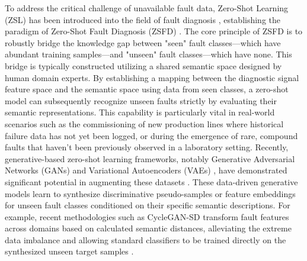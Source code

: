 To address the critical challenge of unavailable fault data, Zero-Shot Learning (ZSL) has been introduced into the field of fault diagnosis \cite{precup2015overview}, establishing the paradigm of Zero-Shot Fault Diagnosis (ZSFD) \cite{lampert2014attribute,xian2019zero,xian2018feature}. The core principle of ZSFD is to robustly bridge the knowledge gap between "seen" fault classes—which have abundant training samples—and "unseen" fault classes—which have none. This bridge is typically constructed utilizing a shared semantic space designed by human domain experts. By establishing a mapping between the diagnostic signal feature space and the semantic space using data from seen classes, a zero-shot model can subsequently recognize unseen faults strictly by evaluating their semantic representations. This capability is particularly vital in real-world scenarios such as the commissioning of new production lines where historical failure data has not yet been logged, or during the emergence of rare, compound faults that haven't been previously observed in a laboratory setting. Recently, generative-based zero-shot learning frameworks, notably Generative Adversarial Networks (GANs) \cite{goodfellow2014generative,arjovsky2017wasserstein} and Variational Autoencoders (VAEs) \cite{lv2020hybrid,kingma2014auto,sohn2015learning}, have demonstrated significant potential in augmenting these datasets \cite{wang2020deep}. These data-driven generative models learn to synthesize discriminative pseudo-samples or feature embeddings for unseen fault classes conditioned on their specific semantic descriptions. For example, recent methodologies such as CycleGAN-SD \cite{liao2024cyclegan,zhu2017unpaired} transform fault features across domains based on calculated semantic distances, alleviating the extreme data imbalance and allowing standard classifiers to be trained directly on the synthesized unseen target samples \cite{wang2020deep}. 


